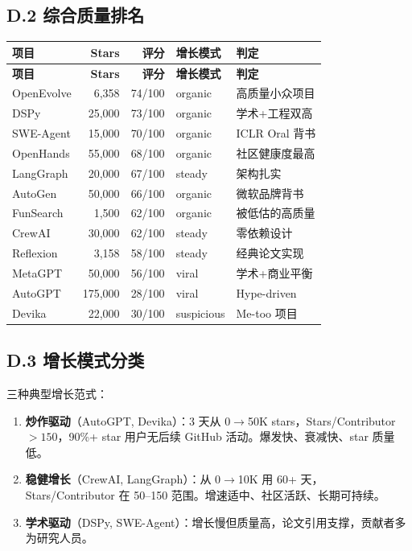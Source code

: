 \subsection*{D.2 综合质量排名}

\begin{longtable}{p{2.5cm}rrp{2cm}p{2.5cm}}
\toprule
\textbf{项目} & \textbf{Stars} & \textbf{评分} & \textbf{增长模式} & \textbf{判定} \\
\midrule
\endfirsthead
\toprule
\textbf{项目} & \textbf{Stars} & \textbf{评分} & \textbf{增长模式} & \textbf{判定} \\
\midrule
\endhead
\bottomrule
\endlastfoot

OpenEvolve & 6,358 & 74/100 & organic & 高质量小众项目 \\
DSPy & 25,000 & 73/100 & organic & 学术+工程双高 \\
SWE-Agent & 15,000 & 70/100 & organic & ICLR Oral 背书 \\
OpenHands & 55,000 & 68/100 & organic & 社区健康度最高 \\
LangGraph & 20,000 & 67/100 & steady & 架构扎实 \\
AutoGen & 50,000 & 66/100 & organic & 微软品牌背书 \\
FunSearch & 1,500 & 62/100 & organic & 被低估的高质量 \\
CrewAI & 30,000 & 62/100 & steady & 零依赖设计 \\
Reflexion & 3,158 & 58/100 & steady & 经典论文实现 \\
MetaGPT & 50,000 & 56/100 & viral & 学术+商业平衡 \\
AutoGPT & 175,000 & 28/100 & viral & Hype-driven \\
Devika & 22,000 & 30/100 & suspicious & Me-too 项目 \\
\end{longtable}

\subsection*{D.3 增长模式分类}

三种典型增长范式：

\begin{enumerate}
\item \textbf{炒作驱动}（AutoGPT, Devika）：3 天从 0$\to$50K stars，Stars/Contributor $> 150$，90\%+ star 用户无后续 GitHub 活动。爆发快、衰减快、star 质量低。
\item \textbf{稳健增长}（CrewAI, LangGraph）：从 0$\to$10K 用 60+ 天，Stars/Contributor 在 50--150 范围。增速适中、社区活跃、长期可持续。
\item \textbf{学术驱动}（DSPy, SWE-Agent）：增长慢但质量高，论文引用支撑，贡献者多为研究人员。
\end{enumerate}

